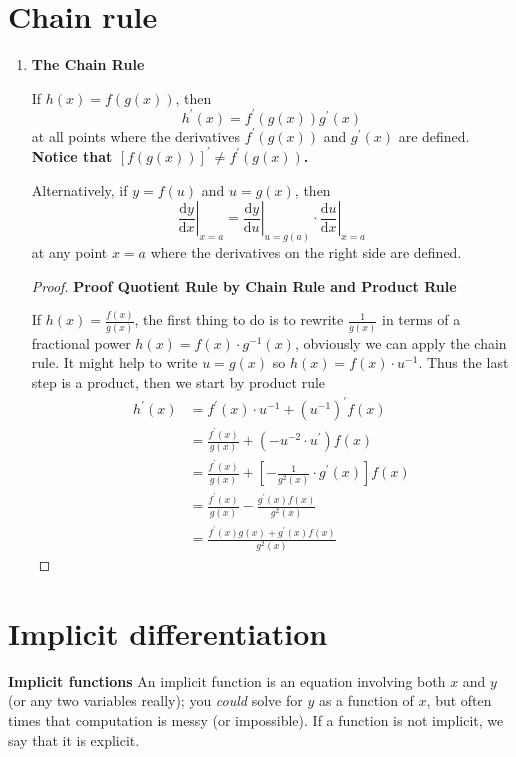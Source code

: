 \section{Chain rule}
\begin{enumerate}
    \item \textbf{The Chain Rule}

        If $h(x)=f(g(x))$, then
        $$
        h^\prime (x)=f^\prime (g(x))g^\prime (x)
        $$
        at all points where the derivatives $f^\prime (g(x))$ and $g^\prime (x)$ are defined. \textbf{Notice that $[f(g(x))]^\prime\neq f^\prime(g(x))$.}

        Alternatively, if $y=f(u)$ and $u=g(x)$, then
        $$
        \left.\frac{\mathrm{d}y}{\mathrm{d}x}\right|_{x=a}=\left.\frac{\mathrm{d}y}{\mathrm{d}u}\right|_{u=g(a)}\cdot\left.\frac{\mathrm{d}u}{\mathrm{d}x}\right|_{x=a}
        $$
        at any point $x=a$ where the derivatives on the right side are defined.

        \begin{proof}
            \textbf{Proof Quotient Rule by Chain Rule and Product Rule}

            If $h(x)=\frac{f(x)}{g(x)}$, the first thing to do is to rewrite $\frac{1}{g(x)}$ in terms of a fractional power $h(x)=f(x)\cdot g^{-1}(x)$, obviously we can apply the chain rule. It might help to write $u=g(x)$ so $h(x)=f(x)\cdot u^{-1}$. Thus the last step is a product, then we start by product rule
            \begin{align*}
                h^\prime (x) & =f^\prime (x)\cdot u^{-1}+(u^{-1})^\prime f(x) \\
                             & =\frac{f^\prime (x)}{g(x)}+(-u^{-2}\cdot u^\prime)f(x) \\
                             & =\frac{f^\prime (x)}{g(x)}+[-\frac{1}{g^2(x)}\cdot g^\prime (x)]f(x) \\
                             & =\frac{f^\prime (x)}{g(x)}-\frac{g^\prime (x)f(x)}{g^2(x)} \\
                             & =\frac{f^\prime (x)g(x)+g^\prime (x)f(x)}{g^2(x)}
            \end{align*}
        \end{proof}
\end{enumerate}

\section{Implicit differentiation}
\textbf{Implicit functions}
An implicit function is an equation involving both $x$ and $y$ (or any two variables really); you \textit{could} solve for $y$ as a function of $x$, but often times that computation is messy (or impossible). If a function is not implicit, we say that it is explicit.

